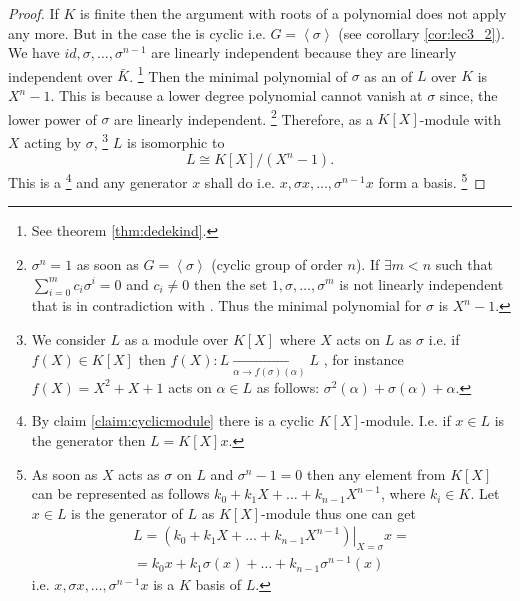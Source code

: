 \begin{theorem}
\begin{proof}
    If $K$ is finite then the argument with roots of a polynomial does
    not apply any more. But in the case the  is
    cyclic i.e. $G = \left<\sigma\right>$ (see corollary
    \ref{cor:lec3_2}). 
    We have $id, \sigma, \dots,
    \sigma^{n-1}$ are linearly independent because they are linearly
    independent  over
    $\bar{K}$.
    \footnote{
      See theorem \ref{thm:dedekind}.
    }
    Then the minimal polynomial of $\sigma$ as an
     of $L$ over $K$ is $X^n - 1$.
    This is because a lower degree polynomial cannot vanish at
    $\sigma$
    since, the lower power of $\sigma$ are linearly independent.
    \footnote{
      $\sigma^n = 1$ as soon as $G=\left<\sigma\right>$ (cyclic group
      of order $n$).
      If $\exists m < n$ such that $\sum_{i=0}^m c_i \sigma^i = 0$ and
      $c_i \ne 0$ then the set $1, \sigma, \dots, \sigma^m$ is not
      linearly independent that is in contradiction with
      .
      Thus the minimal polynomial for $\sigma$ is
      $X^n-1$. 
    }
    Therefore, as a $K\left[X\right]$-module with $X$
    acting by $\sigma$,
    \footnote{
      We consider $L$ as a module over $K\left[X\right]$ where $X$
      acts on $L$ as $\sigma$ i.e. if $f(X) \in K\left[X\right]$ then
      $f(X): L \xrightarrow[\alpha \to f(\sigma)(\alpha)]{} L$
      \cite{bib:KeithConradLinearchar}, for
      instance $f(X) = X^2 + X + 1$ acts on $\alpha \in L$ as follows:
      $\sigma^2(\alpha) + \sigma(\alpha) + \alpha$.
    }
    $L$ is isomorphic to
    \[
    L \cong K\left[X\right]/\left(X^n - 1\right).
    \]
    This is 
    a 
    \footnote{
      By claim \ref{claim:cyclicmodule} there is a cyclic
      $K\left[X\right]$-module. I.e. if $x \in L$ is the generator
      then $L = K\left[X\right] x$.
    }
    and any generator $x$ shall do i.e. $x, \sigma x, \dots,
    \sigma^{n-1} x$ form a basis.
    \footnote{
      As soon as $X$ acts as $\sigma$ on $L$ and $\sigma^n - 1 = 0$ then
      any element from $K\left[X\right]$ can be represented as follows $k_0 + k_1 X +
      \dots + k_{n-1} X^{n-1}$, where $k_i \in K$. Let $x \in L$ is
      the generator of $L$ 
      as $K\left[X\right]$-module thus one can get
      \begin{eqnarray}
      L = \left.\left(k_0 + k_1 X + \dots + k_{n-1}
      X^{n-1}\right)\right|_{X=\sigma}x =
      \nonumber \\
      = k_0 x + k_1 \sigma(x) + \dots + k_{n-1}\sigma^{n-1}(x)
      \nonumber
      \end{eqnarray}
      i.e.  
      $x, \sigma x, \dots, \sigma^{n-1} x$ is a $K$ basis of $L$.
    }
  \end{proof}
\end{theorem}

